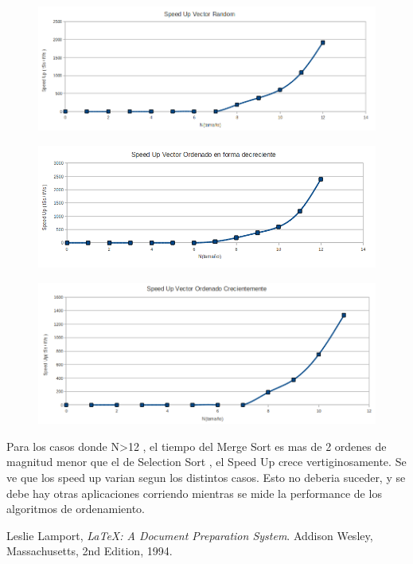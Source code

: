 \begin{figure}[!htp]
\begin{center}
\includegraphics[width=12cm]{Imagenes/SpeedUpVectorRandom.png}
\end{center}
\end{figure} 

\begin{figure}[!htp]
\begin{center}
\includegraphics[width=12cm]{Imagenes/SpeedUpVectorOrdenadoEnFormaDecreciente.png}
\end{center}
\end{figure} 


\begin{figure}[!htp]
\begin{center}
\includegraphics[width=12cm]{Imagenes/SpeedUpVectorOrdenadoEnFormaCreciente.png}
\end{center}
\end{figure} 

Para los casos donde N>12 , el tiempo del Merge Sort es mas de 2 ordenes de magnitud menor que el de Selection Sort , el Speed Up crece vertiginosamente.
Se ve que los speed up varian segun los distintos casos. Esto no deberia suceder, y se debe hay otras aplicaciones corriendo mientras
se mide la performance de los algoritmos de ordenamiento.

\begin{thebibliography}{9}

	  Leslie Lamport,
	  \emph{\LaTeX: A Document Preparation System}.
	  Addison Wesley, Massachusetts,
	  2nd Edition,
	  1994.

\end{thebibliography}

          
